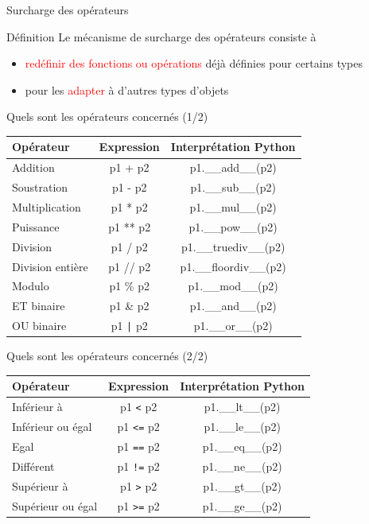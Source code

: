 \documentclass[10pt]{beamer}
\begin{document}
\begin{frame}{Surcharge des opérateurs}
  \begin{block}{Définition}
    \medskip
    Le mécanisme de surcharge des opérateurs consiste à 
    \begin{itemize}
      \item \textcolor{red}{redéfinir des fonctions ou opérations} déjà définies pour certains types
      \item pour les \textcolor{red}{adapter} à d'autres types d'objets
    \end{itemize}
  \end{block}
\end{frame}


\begin{frame}{Quels sont les opérateurs concernés (1/2)}

  \small
  \centering
  \begin{tabular}{lcc}
    \hline
    \textbf{Opérateur} & \textbf{Expression} & \textbf{Interprétation Python} \\
    \hline
    \hline
    Addition & p1 + p2 & p1.\_\_add\_\_(p2) \\
    \hline
    Soustration & p1 - p2 & p1.\_\_sub\_\_(p2) \\
    \hline
    Multiplication & p1 * p2 & p1.\_\_mul\_\_(p2) \\
    \hline
    Puissance & p1 ** p2 & p1.\_\_pow\_\_(p2) \\
    \hline
    Division & p1 / p2 & p1.\_\_truediv\_\_(p2) \\
    \hline
    Division entière & p1 // p2 & p1.\_\_floordiv\_\_(p2) \\
    \hline
    Modulo & p1 \% p2 & p1.\_\_mod\_\_(p2) \\
    \hline
    ET binaire & p1 \& p2 & p1.\_\_and\_\_(p2) \\
    \hline
    OU binaire & p1 \texttt{|} p2 & p1.\_\_or\_\_(p2) \\
    \hline
  \end{tabular}  
\end{frame}


\begin{frame}{Quels sont les opérateurs concernés (2/2)}

  \small
  \centering
  \begin{tabular}{lcc}
    \hline
    \textbf{Opérateur} & \textbf{Expression} & \textbf{Interprétation Python} \\
    \hline
    \hline
    Inférieur à & p1 \texttt{<} p2 & p1.\_\_lt\_\_(p2) \\
    \hline
    Inférieur ou égal & p1 \texttt{<=} p2 & p1.\_\_le\_\_(p2) \\
    \hline
    Egal & p1 \texttt{==} p2 & p1.\_\_eq\_\_(p2) \\
    \hline
    Différent & p1 \texttt{!=} p2 & p1.\_\_ne\_\_(p2) \\
    \hline
    Supérieur à & p1 \texttt{>} p2 & p1.\_\_gt\_\_(p2) \\
    \hline
    Supérieur ou égal & p1 \texttt{>=} p2 & p1.\_\_ge\_\_(p2) \\
    \hline
  \end{tabular}  
\end{frame}
\end{document}
